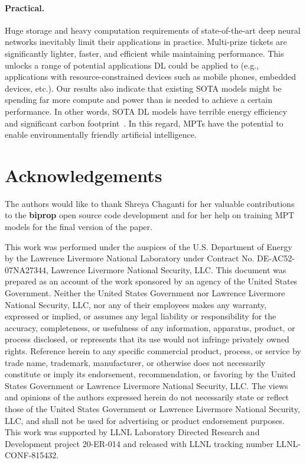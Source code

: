 \documentclass{article} \usepackage{iclr2021_conference,times}
\begin{document}
\paragraph{Practical.}

Huge storage and heavy computation requirements of state-of-the-art deep neural networks inevitably limit their applications in practice. Multi-prize tickets are significantly lighter, faster, and efficient while maintaining performance. This unlocks a range of potential applications DL could be applied to (e.g., applications with resource-constrained devices such as mobile phones, embedded devices, etc.). Our results also indicate that existing SOTA models might be spending far more compute and power than is needed to achieve a certain performance. In other words, SOTA DL models have terrible energy efficiency and significant carbon footprint~\citep{strubell2019energy}. In this regard, MPTs have the potential to enable environmentally friendly artificial intelligence.





















\section*{Acknowledgements} 
The authors would like to thank Shreya Chaganti for her valuable contributions to the \textbf{biprop} open source code development and for her help on training MPT models for the final version of the paper.

This work was performed under the auspices of the U.S. Department of Energy by the Lawrence Livermore National Laboratory under Contract No. DE-AC52-07NA27344, Lawrence Livermore National Security, LLC. This document was prepared as an account of the work sponsored by an agency of the United States Government. Neither the United States Government nor Lawrence Livermore National Security, LLC, nor any of their employees makes any warranty, expressed or implied, or assumes any legal liability or responsibility for the accuracy, completeness, or usefulness of any information, apparatus, product, or process disclosed, or represents that its use would not infringe privately owned rights. Reference herein to any specific commercial product, process, or service by trade name, trademark, manufacturer, or otherwise does not necessarily constitute or imply its endorsement, recommendation, or favoring by the United States Government or Lawrence Livermore National Security, LLC. The views and opinions of the authors expressed herein do not necessarily state or reflect those of the United States Government or Lawrence Livermore National Security, LLC, and shall not be used for advertising or product endorsement purposes. This work was supported by LLNL Laboratory Directed Research and Development project 20-ER-014 and released with LLNL tracking number LLNL-CONF-815432.
\end{document}
